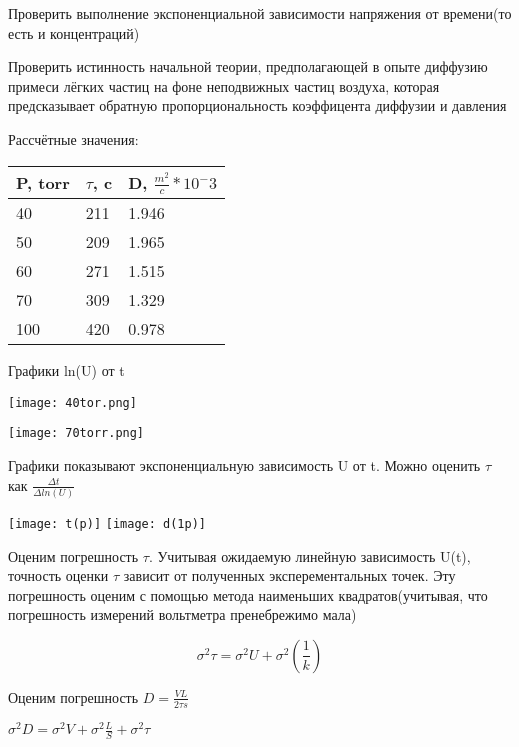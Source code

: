 \documentclass{article}
\begin{document}
\vspace{30pt}

Проверить выполнение экспоненциальной зависимости напряжения от времени(то есть и концентраций)\par
Проверить истинность начальной теории, предполагающей в опыте диффузию примеси лёгких частиц на фоне неподвижных частиц воздуха,
которая предсказывает обратную пропорциональность коэффицента диффузии и давления

Рассчётные значения:

\begin{center}
    \begin{tabular}{ | m{5em} | m{3cm} | m{3cm} | }
        \hline
        P, torr & $\tau$, c & D, $\frac{m^2}{c} * 10^-3$ \\
        \hline
        40 & 211 & 1.946 \\
        \hline
        50 & 209 & 1.965\\
        \hline
        60 & 271 & 1.515\\ 
        \hline
        70 & 309 & 1.329 \\
        \hline
        100 & 420 & 0.978\\
        \hline
    \end{tabular}
\end{center}

\pagebreak

Графики ln(U) от t \par
\texttt{[image: 40tor.png]}\par
\texttt{[image: 70torr.png]}

Графики показывают экспоненциальную зависимость U от t. Можно оценить $\tau$ как $\frac{\Delta{t}}{\Delta{ln(U)}}$

\pagebreak

\texttt{[image: t(p)]}
\texttt{[image: d(1p)]}

\pagebreak

Оценим погрешность $\tau$. Учитывая ожидаемую линейную зависимость U(t), точность оценки $\tau$ зависит от полученных эксперементальных точек.
Эту погрешность оценим с помощью метода наименьших квадратов(учитывая, что погрешность измерений вольтметра пренебрежимо мала) \par

\[\sigma^2{\tau} = \sigma^2{U} + \sigma^2(\frac{1}{k})\]

Оценим погрешность $D = \frac{VL}{2\tau{s}}$ \par
$\sigma^2{D} = \sigma^2{V} + \sigma^2{\frac{L}{S}} + \sigma^2{\tau}$ 
\end{document}
